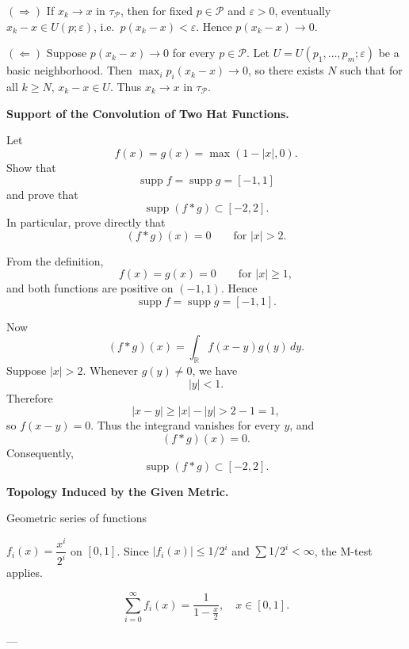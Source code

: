 \begin{solution}
$(\Rightarrow)$ If $x_k\to x$ in $\tau_{\mathcal P}$, then for fixed $p\in\mathcal P$ and $\varepsilon>0$,
	eventually $x_k-x\in U(p;\varepsilon)$, i.e.\ $p(x_k-x)<\varepsilon$. Hence $p(x_k-x)\to0$.

	$(\Leftarrow)$ Suppose $p(x_k-x)\to0$ for every $p\in\mathcal P$. Let
	$U=U(p_1,\dots,p_m;\varepsilon)$ be a basic neighborhood. Then
	$\max_i p_i(x_k-x)\to0$, so there exists $N$ such that for all $k\ge N$,
	$x_k-x\in U$. Thus $x_k\to x$ in $\tau_{\mathcal P}$.
\end{solution}

\begin{problem}[CP-II-0369]
\label{prob:cp-ii-0369}
\textbf{Support of the Convolution of Two Hat Functions.}

\hspace*{1.5em}Let
\[
f(x)=g(x)=\max(1-|x|,0).
\]
Show that
\[
\operatorname{supp}f
=
\operatorname{supp}g
=
[-1,1]
\]
and prove that
\[
\operatorname{supp}(f*g)\subset[-2,2].
\]
In particular, prove directly that
\[
(f*g)(x)=0
\qquad\text{for }|x|>2.
\]
\end{problem}

\begin{solution}
From the definition,
\[
f(x)=g(x)=0
\qquad\text{for }|x|\ge1,
\]
and both functions are positive on \((-1,1)\). Hence
\[
\operatorname{supp}f
=
\operatorname{supp}g
=
[-1,1].
\]

Now
\[
(f*g)(x)
=
\int_{\mathbb R}f(x-y)g(y)\,dy.
\]
Suppose \(|x|>2\). Whenever \(g(y)\ne0\), we have
\[
|y|<1.
\]
Therefore
\[
|x-y|
\ge
|x|-|y|
>
2-1
=
1,
\]
so \(f(x-y)=0\). Thus the integrand vanishes for every \(y\), and
\[
(f*g)(x)=0.
\]
Consequently,
\[
\boxed{
\operatorname{supp}(f*g)\subset[-2,2].
}
\]
\end{solution}


\begin{problem}[CP-II-0370]
\label{prob:cp-ii-0370}
\textbf{Topology Induced by the Given Metric.}

\hspace*{1.5em}Geometric series of functions

$f_i(x) = \dfrac{x^i}{2^i}$ on $[0,1]$.
Since $|f_i(x)| \le 1/2^i$ and $\sum 1/2^i < \infty$, the M-test applies.

\[
\sum_{i=0}^\infty f_i(x) = \frac{1}{1-\tfrac{x}{2}}, \quad x\in[0,1].
\]

---
\end{problem}

